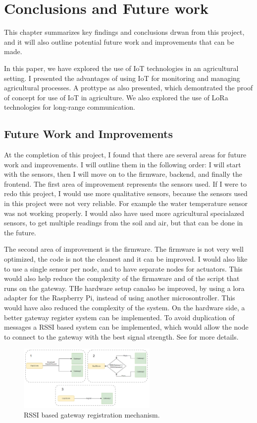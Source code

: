 \chapter{Conclusions and Future work}
This chapter summarizes key findings and conclusions drwan from this project,
and it will also outline potential future work and improvements that can be made.

In this paper, we have explored the use of IoT technologies in an agricultural setting. I presented 
the advantages of using IoT for monitoring and managing  agricultural processes. A prottype as also
presented, which demontrated the proof of concept for use of IoT in agriculture. 
We also explored the use of LoRa technologies for long-range communication. 

\section{Future Work and Improvements}
At the completion of this project, I found that there are several areas for future work and improvements.
I will outline them in the following order: I will start with the sensors, then I will move on
to the firmware, backend, and finally the frontend. The first area of improvement represents the sensors used.
If I were to redo this project, I would use more qualitative sensors, because 
the sensors used in this project were not very reliable. For example the water temperature sensor
was not working properly. I would also have used more agricultural specialazed sensors,
to get multiple readings from the soil and air, but that can be done in the future.

The second area of improvement is the firmware.
The firmware is not very well optimized, the code is not the cleanest and it can be improved.
I would also like to use a single sensor per node, and to have separate nodes for actuators.
This would also help reduce the complexity of the firmaware and of the script that runs on the gateway.
THe hardware setup canalso be improved, by using a lora adapter for the Raspberry Pi,
instead of using another microsontroller. This would have also reduced the complexity of the system.
On the hardware side, a better gateway register system can be implemented. To avoid duplication 
of messages a RSSI based system can be implemented, which would allow the node to connect
to the gateway with the best signal strength. See \cite{lora_gateway_rssi} for more details.

\begin{figure}[ht]
    \centering
    \includegraphics[width=0.6\textwidth]{images/RSSI-mechanism.png}
    \caption{RSSI based gateway registration mechanism.}
    \label{fig:lora_gateway_rssi}
\end{figure}

